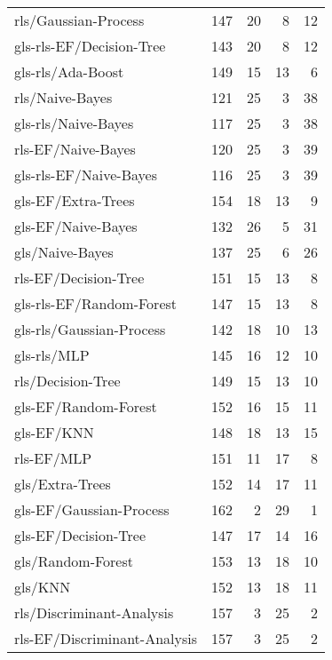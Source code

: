 \begin{longtable}{lrrrr}
    rls/Gaussian-Process             &  147 &  20 &   8 &  12 \\
    gls-rls-EF/Decision-Tree         &  143 &  20 &   8 &  12 \\
    gls-rls/Ada-Boost                &  149 &  15 &  13 &   6 \\
    rls/Naive-Bayes                  &  121 &  25 &   3 &  38 \\
    gls-rls/Naive-Bayes              &  117 &  25 &   3 &  38 \\
    rls-EF/Naive-Bayes               &  120 &  25 &   3 &  39 \\
    gls-rls-EF/Naive-Bayes           &  116 &  25 &   3 &  39 \\
    gls-EF/Extra-Trees               &  154 &  18 &  13 &   9 \\
    gls-EF/Naive-Bayes               &  132 &  26 &   5 &  31 \\
    gls/Naive-Bayes                  &  137 &  25 &   6 &  26 \\
    rls-EF/Decision-Tree             &  151 &  15 &  13 &   8 \\
    gls-rls-EF/Random-Forest         &  147 &  15 &  13 &   8 \\
    gls-rls/Gaussian-Process         &  142 &  18 &  10 &  13 \\
    gls-rls/MLP                      &  145 &  16 &  12 &  10 \\
    rls/Decision-Tree                &  149 &  15 &  13 &  10 \\
    gls-EF/Random-Forest             &  152 &  16 &  15 &  11 \\
    gls-EF/KNN                       &  148 &  18 &  13 &  15 \\
    rls-EF/MLP                       &  151 &  11 &  17 &   8 \\
    gls/Extra-Trees                  &  152 &  14 &  17 &  11 \\
    gls-EF/Gaussian-Process          &  162 &   2 &  29 &   1 \\
    gls-EF/Decision-Tree             &  147 &  17 &  14 &  16 \\
    gls/Random-Forest                &  153 &  13 &  18 &  10 \\
    gls/KNN                          &  152 &  13 &  18 &  11 \\
    rls/Discriminant-Analysis        &  157 &   3 &  25 &   2 \\
    rls-EF/Discriminant-Analysis     &  157 &   3 &  25 &   2 \\

\end{longtable}
